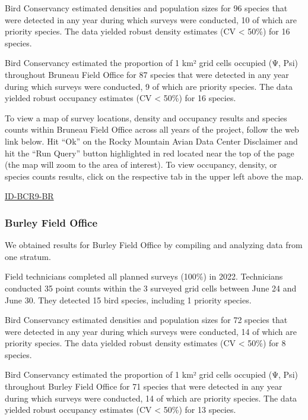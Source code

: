 \documentclass[
  letterpaper,
  DIV=11,
  numbers=noendperiod,
  oneside]{scrreprt}
\begin{document}
Bird Conservancy estimated densities and population sizes for 96 species
that were detected in any year during which surveys were conducted, 10
of which are priority species. The data yielded robust density estimates
(CV \textless{} 50\%) for 16 species.

Bird Conservancy estimated the proportion of 1 km² grid cells occupied
(Ψ, Psi) throughout Bruneau Field Office for 87 species that were
detected in any year during which surveys were conducted, 9 of which are
priority species. The data yielded robust occupancy estimates (CV
\textless{} 50\%) for 16 species.

To view a map of survey locations, density and occupancy results and
species counts within Bruneau Field Office across all years of the
project, follow the web link below. Hit ``Ok'' on the Rocky Mountain
Avian Data Center Disclaimer and hit the ``Run Query'' button
highlighted in red located near the top of the page (the map will zoom
to the area of interest). To view occupancy, density, or species counts
results, click on the respective tab in the upper left above the map.

\href{http://www.rmbo.org/new_site/adc/QueryWindow.aspx\#N4IgzgLgTghhCuBbEAuABCAkgEQLQCEBhAJQE4Dj194oBTGeNAewDM0AZGAOwBM0BZbjADmtRLS4Q0uNPijwu9RgDEAlrQA2fAPIsWqgMa0QAXyA}{ID-BCR9-BR}

\hypertarget{burley-field-office}{%
\subsubsection{Burley Field Office}\label{burley-field-office}}

We obtained results for Burley Field Office by compiling and analyzing
data from one stratum.

Field technicians completed all planned surveys (100\%) in 2022.
Technicians conducted 35 point counts within the 3 surveyed grid cells
between June 24 and June 30. They detected 15 bird species, including 1
priority species.

Bird Conservancy estimated densities and population sizes for 72 species
that were detected in any year during which surveys were conducted, 14
of which are priority species. The data yielded robust density estimates
(CV \textless{} 50\%) for 8 species.

Bird Conservancy estimated the proportion of 1 km² grid cells occupied
(Ψ, Psi) throughout Burley Field Office for 71 species that were
detected in any year during which surveys were conducted, 14 of which
are priority species. The data yielded robust occupancy estimates (CV
\textless{} 50\%) for 13 species.
\end{document}
